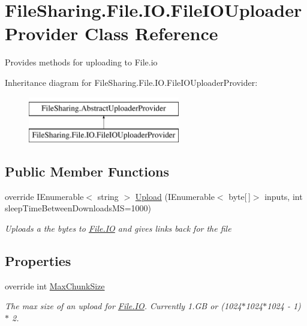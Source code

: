 \hypertarget{class_file_sharing_1_1_file_1_1_i_o_1_1_file_i_o_uploader_provider}{}\section{File\+Sharing.\+File.\+I\+O.\+File\+I\+O\+Uploader\+Provider Class Reference}
\label{class_file_sharing_1_1_file_1_1_i_o_1_1_file_i_o_uploader_provider}


Provides methods for uploading to File.\+io  


Inheritance diagram for File\+Sharing.\+File.\+I\+O.\+File\+I\+O\+Uploader\+Provider\+:\begin{figure}[H]
\begin{center}
\leavevmode
\includegraphics[height=2.000000cm]{class_file_sharing_1_1_file_1_1_i_o_1_1_file_i_o_uploader_provider}
\end{center}
\end{figure}
\subsection*{Public Member Functions}
\begin{DoxyCompactItemize}
\item 
override I\+Enumerable$<$ string $>$ \hyperlink{class_file_sharing_1_1_file_1_1_i_o_1_1_file_i_o_uploader_provider_a991a7eebd1a55bc38e0b760a0f824928}{Upload} (I\+Enumerable$<$ byte\mbox{[}$\,$\mbox{]}$>$ inputs, int sleep\+Time\+Between\+Downloads\+MS=1000)
\begin{DoxyCompactList}\small\item\em Uploads a the bytes to \hyperlink{namespace_file_sharing_1_1_file_1_1_i_o}{File.\+IO} and gives links back for the file \end{DoxyCompactList}\end{DoxyCompactItemize}
\subsection*{Properties}
\begin{DoxyCompactItemize}
\item 
override int \hyperlink{class_file_sharing_1_1_file_1_1_i_o_1_1_file_i_o_uploader_provider_aece58c355e86215e63487ad62831f33c}{Max\+Chunk\+Size}
\begin{DoxyCompactList}\small\item\em The max size of an upload for \hyperlink{namespace_file_sharing_1_1_file_1_1_i_o}{File.\+IO}. Currently 1.\+GB or (1024$\ast$1024$\ast$1024 -\/ 1) $\ast$ 2. \end{DoxyCompactList}\end{DoxyCompactItemize}


